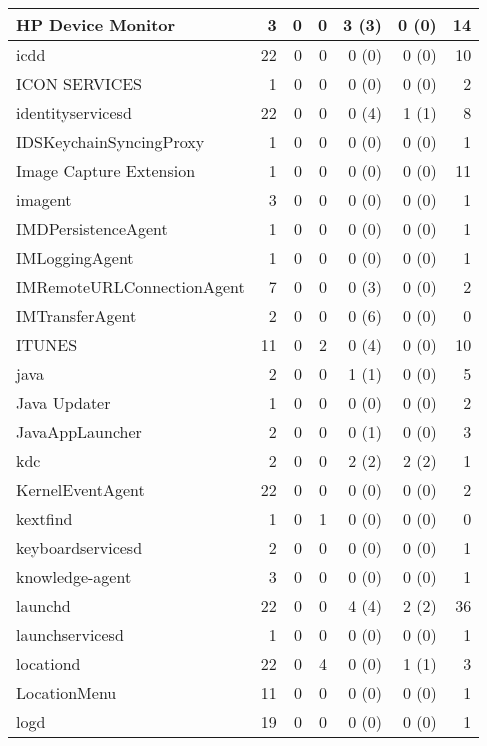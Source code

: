 \begin{adjustwidth}{-2in}{}
\begin{scriptsize}
\begin{longtable}[l]{ l | r | r | r | r | r | r }
    HP Device Monitor &  3 &  0 &  0 &  3 (3) &  0 (0) & 14 \\ \hline
    icdd &  22 &  0 &  0 &  0 (0) &  0 (0) & 10 \\ \hline
    ICON SERVICES &  1 &  0 &  0 &  0 (0) &  0 (0) &  2 \\ \hline
    identityservicesd & 22 &  0 &  0 &  0 (4) &  1 (1) &  8 \\ \hline
    IDSKeychainSyncingProxy &  1 &  0 &  0 &  0 (0) &  0 (0) &  1 \\ \hline
    Image Capture Extension &  1 &  0 &  0 &  0 (0) &  0 (0) & 11 \\ \hline
    imagent &  3 &  0 &  0 &  0 (0) &  0 (0) &  1 \\ \hline
    IMDPersistenceAgent &  1 &  0 &  0 &  0 (0) &  0 (0) &  1 \\ \hline
    IMLoggingAgent & 1 &  0 &  0 &  0 (0) &  0 (0) &  1 \\ \hline
    IMRemoteURLConnectionAgent & 7 &  0 &  0 &  0 (3) &  0 (0) &  2 \\ \hline
    IMTransferAgent &  2 &  0 &  0 &  0 (6) &  0 (0) &  0 \\ \hline
    ITUNES &  11 &  0 &  2 &  0 (4) &  0 (0) & 10 \\ \hline
    java & 2 &  0 &  0 &  1 (1) &  0 (0) &  5 \\ \hline
    Java Updater &  1 &  0 &  0 &  0 (0) &  0 (0) &  2 \\ \hline
    JavaAppLauncher &  2 &  0 &  0 &  0 (1) &  0 (0) &  3 \\ \hline
    kdc &  2 &  0 &  0 &  2 (2) &  2 (2) &  1 \\ \hline
    KernelEventAgent &  22 &  0 &  0 &  0 (0) &  0 (0) &  2 \\ \hline
    kextfind & 1 &  0 &  1 &  0 (0) &  0 (0) &  0 \\ \hline
    keyboardservicesd &  2 &  0 &  0 &  0 (0) &  0 (0) &  1 \\ \hline
    knowledge-agent &  3 &  0 &  0 &  0 (0) &  0 (0) &  1 \\ \hline
    launchd & 22 &  0 &  0 &  4 (4) &  2 (2) & 36 \\ \hline
    launchservicesd &  1 &  0 &  0 &  0 (0) &  0 (0) &  1 \\ \hline
    locationd & 22 &  0 &  4 &  0 (0) &  1 (1) &  3 \\ \hline
    LocationMenu &  11 &  0 &  0 &  0 (0) &  0 (0) &  1 \\ \hline
    logd &  19 &  0 &  0 &  0 (0) &  0 (0) &  1 \\ \hline

\end{longtable}
\end{scriptsize}
\end{adjustwidth}
